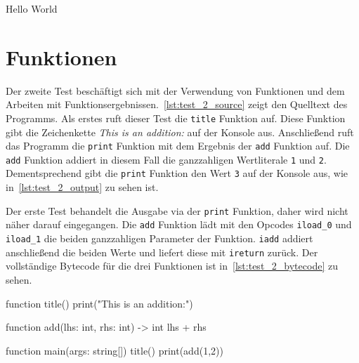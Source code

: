 
\begin{ToyaCode}[numbers=none, caption={Konsolen-Ausgabe des Hello World Programms},label=lst:test_1_output]
Hello World    
\end{ToyaCode}

\section{Funktionen}

Der zweite Test beschäftigt sich mit der Verwendung von Funktionen und dem Arbeiten mit Funktionsergebnissen.~\autoref{lst:test_2_source} zeigt den Quelltext des Programms. Als erstes ruft dieser Test die \texttt{title} Funktion auf. Diese Funktion gibt die Zeichenkette \textit{This is an addition:} auf der Konsole aus. Anschließend ruft das Programm die \texttt{print} Funktion mit dem Ergebnis der \texttt{add} Funktion auf. Die \texttt{add} Funktion addiert in diesem Fall die ganzzahligen Wertliterale \texttt{1} und \texttt{2}. Dementsprechend gibt die \texttt{print} Funktion den Wert \texttt{3} auf der Konsole aus, wie in~\autoref{lst:test_2_output} zu sehen ist.

Der erste Test behandelt die Ausgabe via der \texttt{print} Funktion, daher wird nicht näher darauf eingegangen. Die \texttt{add} Funktion lädt mit den Opcodes \texttt{iload\_0} und \texttt{iload\_1} die beiden ganzzahligen Parameter der Funktion. \texttt{iadd} addiert anschließend die beiden Werte und liefert diese mit \texttt{ireturn} zurück. Der vollständige Bytecode für die drei Funktionen ist in~\autoref{lst:test_2_bytecode} zu sehen.

\begin{ToyaCode}[numbers=none, caption={Funktionen},label=lst:test_2_source]
function title() {
    print("This is an addition:")
}

function add(lhs: int, rhs: int) -> int {
    lhs + rhs
}

function main(args: string[]) {
    title()
    print(add(1,2))
}
\end{ToyaCode}  

